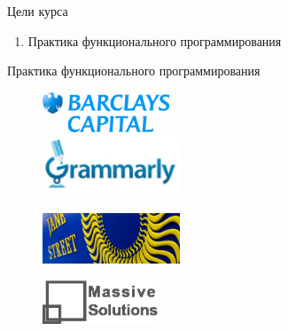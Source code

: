\documentclass{beamer}
\begin{document}
\begin{frame}{Цели курса}
  \begin{enumerate}
  \item Практика функционального программирования
  \end{enumerate}
\end{frame}

\begin{frame}{Практика функционального программирования}
  \begin{figure}[h]
    \begin{minipage}[h]{0.49\linewidth}
      \begin{center}
        \includegraphics[height=12mm]{lecture0/Barcap-logo.eps}
      \end{center}
    \end{minipage}
    \begin{minipage}[h]{0.49\linewidth}
      \begin{center}
        \includegraphics[height=18mm]{lecture0/logo_grammarly.eps}
      \end{center}
    \end{minipage}
  \end{figure}
  \begin{figure}
    \includegraphics[height=15mm]{lecture0/janestreet.eps}
  \end{figure}
  \begin{figure}[h]
    \begin{minipage}[h]{0.49\linewidth}
      \begin{center}
        \includegraphics[height=13mm]{lecture0/Massive_Solutions.eps}

\end{center}
\end{minipage}
\end{figure}
\end{frame}
\end{document}
